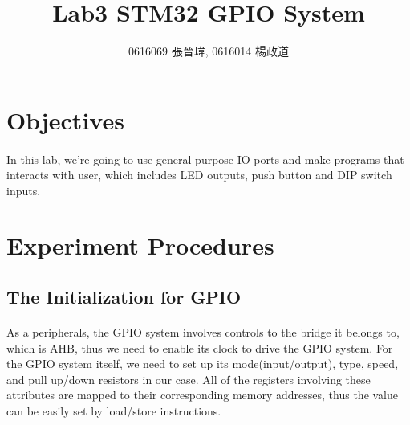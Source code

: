 \title{Lab3 STM32 GPIO System}
\author{0616069 張晉瑋, 0616014 楊政道}
\maketitle
\thispagestyle{fancy}
\section{Objectives}
\paragraph{}
In this lab, we're going to use general purpose IO ports and make programs that interacts with user,
which includes LED outputs, push button and DIP switch inputs.

\section{Experiment Procedures}
\subsection{The Initialization for GPIO}
\paragraph{}
As a peripherals, the GPIO system involves controls to the bridge it belongs to, which is AHB,
thus we need to enable its clock to drive the GPIO system.
For the GPIO system itself, we need to set up its mode(input/output), type, speed, and pull up/down resistors in our case.
All of the registers involving these attributes are mapped to their corresponding memory addresses, 
thus the value can be easily set by load/store instructions.

